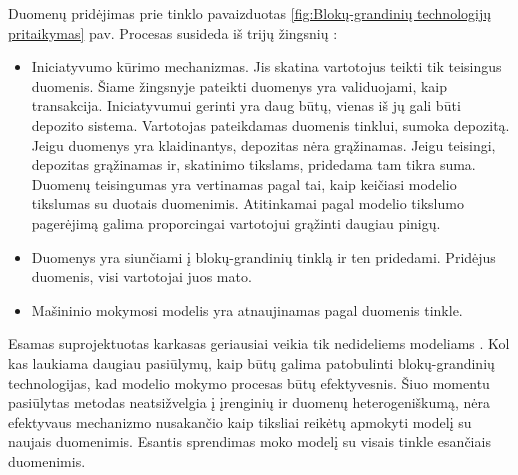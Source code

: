 \documentclass{VUMIFInfBakalaurinis}
\begin{document}
\par Duomenų pridėjimas prie tinklo pavaizduotas \ref{fig:Blokų-grandinių technologijų pritaikymas} pav. Procesas susideda iš trijų žingsnių \cite{25}:
\begin{itemize}
    \item Iniciatyvumo kūrimo mechanizmas. Jis skatina vartotojus teikti tik teisingus duomenis. Šiame žingsnyje pateikti duomenys yra validuojami, kaip transakcija. Iniciatyvumui gerinti yra daug būtų, vienas iš jų gali būti depozito sistema. Vartotojas pateikdamas duomenis tinklui, sumoka depozitą. Jeigu duomenys yra klaidinantys, depozitas nėra grąžinamas. Jeigu teisingi, depozitas grąžinamas ir, skatinimo tikslams, pridedama tam tikra suma. Duomenų teisingumas yra vertinamas pagal tai, kaip keičiasi modelio tikslumas su duotais duomenimis. Atitinkamai pagal modelio tikslumo pagerėjimą galima proporcingai vartotojui grąžinti daugiau pinigų.
    \item Duomenys yra siunčiami į blokų-grandinių tinklą ir ten pridedami. Pridėjus duomenis, visi vartotojai juos mato.
    \item Mašininio mokymosi modelis yra atnaujinamas pagal duomenis tinkle.
\end{itemize}
\par Esamas suprojektuotas karkasas geriausiai veikia tik nedideliems modeliams \cite{25}. Kol kas laukiama daugiau pasiūlymų, kaip būtų galima patobulinti blokų-grandinių technologijas, kad modelio mokymo procesas būtų efektyvesnis. Šiuo momentu pasiūlytas metodas neatsižvelgia į įrenginių ir duomenų heterogeniškumą, nėra efektyvaus mechanizmo nusakančio kaip tiksliai reikėtų apmokyti modelį su naujais duomenimis. Esantis sprendimas moko modelį su visais tinkle esančiais duomenimis. 
\end{document}

